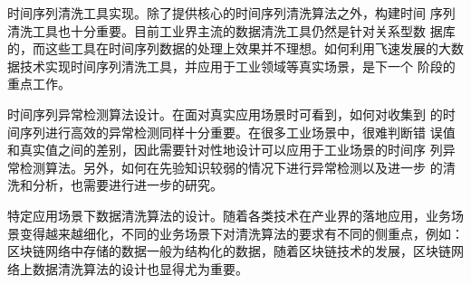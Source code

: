 \documentclass{article}
\begin{document}
\par 时间序列清洗工具实现。除了提供核心的时间序列清洗算法之外，构建时间 序列清洗工具也十分重要。目前工业界主流的数据清洗工具仍然是针对关系型数 据库的，而这些工具在时间序列数据的处理上效果并不理想。如何利用飞速发展的大数据技术实现时间序列清洗工具，并应用于工业领域等真实场景，是下一个 阶段的重点工作。 

\par 时间序列异常检测算法设计。在面对真实应用场景时可看到，如何对收集到 的时间序列进行高效的异常检测同样十分重要。在很多工业场景中，很难判断错 误值和真实值之间的差别，因此需要针对性地设计可以应用于工业场景的时间序 列异常检测算法。另外，如何在先验知识较弱的情况下进行异常检测以及进一步 的清洗和分析，也需要进行进一步的研究。

\par 特定应用场景下数据清洗算法的设计。随着各类技术在产业界的落地应用，业务场景变得越来越细化，不同的业务场景下对清洗算法的要求有不同的侧重点，例如：区块链网络中存储的数据一般为结构化的数据，随着区块链技术的发展，区块链网络上数据清洗算法的设计也显得尤为重要。







\end{document}
